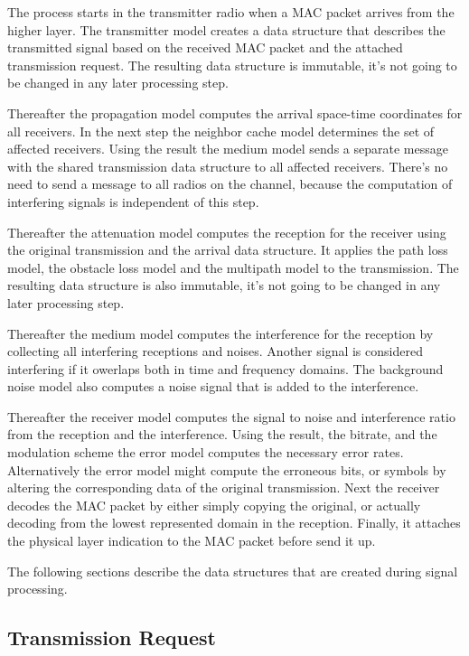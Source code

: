 The process starts in the transmitter radio when a MAC packet arrives from the
higher layer. The transmitter model creates a data structure that describes the
transmitted signal based on the received MAC packet and the attached
transmission request. The resulting data structure is immutable, it's not going
to be changed in any later processing step.

Thereafter the propagation model computes the arrival space-time coordinates for
all receivers. In the next step the neighbor cache model determines the set of
affected receivers. Using the result the medium model sends a separate message
with the shared transmission data structure to all affected receivers. There's
no need to send a message to all radios on the channel, because the computation
of interfering signals is independent of this step.

Thereafter the attenuation model computes the reception for the receiver using
the original transmission and the arrival data structure. It applies the path
loss model, the obstacle loss model and the multipath model to the transmission.
The resulting data structure is also immutable, it's not going to be changed in
any later processing step.

Thereafter the medium model computes the interference for the reception by
collecting all interfering receptions and noises. Another signal is considered
interfering if it owerlaps both in time and frequency domains. The background
noise model also computes a noise signal that is added to the interference.

Thereafter the receiver model computes the signal to noise and interference
ratio from the reception and the interference. Using the result, the bitrate,
and the modulation scheme the error model computes the necessary error rates.
Alternatively the error model might compute the erroneous bits, or symbols by
altering the corresponding data of the original transmission. Next the receiver
decodes the MAC packet by either simply copying the original, or actually
decoding from the lowest represented domain in the reception. Finally, it
attaches the physical layer indication to the MAC packet before send it up.

The following sections describe the data structures that are created during
signal processing.

\subsection{Transmission Request}


